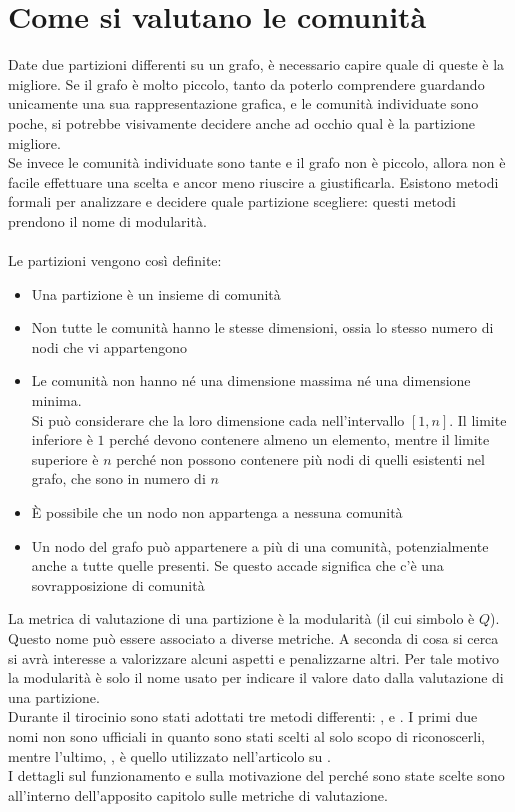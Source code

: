 \section{Come si valutano le comunità}
Date due partizioni differenti su un grafo, è necessario capire quale di queste è la migliore. Se il grafo è molto piccolo, tanto da poterlo comprendere guardando unicamente una sua rappresentazione grafica, e le comunità individuate sono poche, si potrebbe visivamente decidere anche ad occhio qual è la partizione migliore.\\
Se invece le comunità individuate sono tante e il grafo non è piccolo, allora non è facile effettuare una scelta e ancor meno riuscire a giustificarla. Esistono metodi formali per analizzare e decidere quale partizione scegliere: questi metodi prendono il nome di modularità.\\
\\
Le partizioni vengono così definite:
\begin{itemize}
	\item Una partizione è un insieme di comunità
	\item Non tutte le comunità hanno le stesse dimensioni, ossia lo stesso numero di nodi che vi appartengono
	\item Le comunità non hanno né una dimensione massima né una dimensione minima.\\
	Si può considerare che la loro dimensione cada nell'intervallo $[1, n]$. Il limite inferiore è $1$ perché devono contenere almeno un elemento, mentre il limite superiore è $n$ perché non possono contenere più nodi di quelli esistenti nel grafo, che sono in numero di $n$
	\item È possibile che un nodo non appartenga a nessuna comunità
	\item Un nodo del grafo può appartenere a più di una comunità, potenzialmente anche a tutte quelle presenti. Se questo accade significa che c'è una sovrapposizione di comunità
\end{itemize}
La metrica di valutazione di una partizione è la modularità (il cui simbolo è $Q$). Questo nome può essere associato a diverse metriche. A seconda di cosa si cerca si avrà interesse a valorizzare alcuni aspetti e penalizzarne altri. Per tale motivo la modularità è solo il nome usato per indicare il valore dato dalla valutazione di una partizione.\\
Durante il tirocinio sono stati adottati tre metodi differenti: \mmax, \mover e \mmod. I primi due nomi non sono ufficiali in quanto sono stati scelti al solo scopo di riconoscerli, mentre l'ultimo, \mmod , è quello utilizzato nell'articolo su \cnrl \cite{CNRL_paper}.\\
I dettagli sul funzionamento e sulla motivazione del perché sono state scelte sono all'interno dell'apposito capitolo sulle metriche di valutazione.
%
